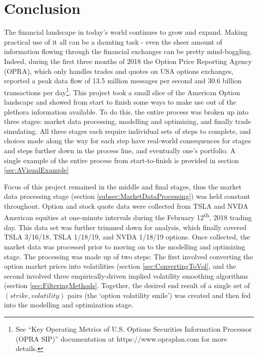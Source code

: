 \documentclass[12pt, a4paper, notitlepage]{article}
\numberwithin{equation}{subsection}
\numberwithin{figure}{subsection}
\numberwithin{table}{subsection}
\newcommand{\newpar}{\newline \newline}
\begin{document}
\section{Conclusion} \label{sec:DiscussionAndConclusion}
The financial landscape in today's world continues to grow and expand.  Making practical use of it all can be a daunting task - even the sheer amount of information flowing through the financial exchanges can be pretty mind-boggling.  Indeed, during the first three months of 2018 the Option Price Reporting Agency (OPRA), which only handles trades and quotes on USA options exchanges, reported a peak data flow of 13.5 million messages per second and 30.6 billion transactions per day\footnote{See ``Key Operating Metrics of U.S. Options Securities Information Processor (OPRA SIP)'' documentation at https://www.opraplan.com for more details.}.
\newpar
This project took a small slice of the American Option landscape and showed from start to finish some ways to make use out of the plethora information available.  To do this, the entire process was broken up into three stages:  market data processing, modelling and optimizing, and finally trade simulating.  All three stages each require individual sets of steps to complete, and choices made along the way for each step have real-world consequences for stages and steps further down in the process line, and eventually one's portfolio.  A single example of the entire process from start-to-finish is provided in section \ref{sec:AVisualExample}

Focus of this project remained in the middle and final stages, thus the market data processing stage (section \ref{subsec:MarketDataProcessing}) was held constant throughout.  Option and stock quote data were collected from TSLA and NVDA American equities at one-minute intervals during the February 12\textsuperscript{th}, 2018 trading day.  This data set was further trimmed down for analysis, which finally covered TSLA 3/16/18, TSLA 1/18/19, and NVDA 1/18/19 options.
\newpar
Once collected, the market data was processed prior to moving on to the modelling and optimizing stage.  The processing was made up of two steps:  The first involved converting the option market prices into volatilities (section \ref{sec:ConvertingToVol}, and the second involved three empirically-driven implied volatility smoothing algorithms (section \ref{sec:FilteringMethods}.  Together, the desired end result of a single set of $(strike, volatility)$ pairs (the `option volatility smile') was created and then fed into the modelling and optimization stage.
\end{document}
